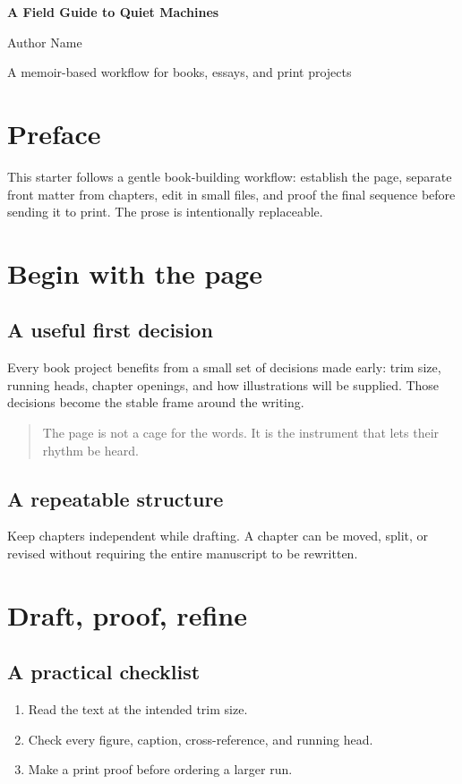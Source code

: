 \documentclass[11pt,twoside,openright]{memoir}
\begin{document}
\frontmatter
\begin{titlingpage}
\centering
\vspace*{1.1in}
{\Huge\bfseries A Field Guide to Quiet Machines\par}
\vspace{14pt}{\Large A multi-file book starter\par}
\vfill
{\Large Author Name\par}\vspace{8pt}
{\small A memoir-based workflow for books, essays, and print projects\par}
\end{titlingpage}
\cleartorecto
\chapter*{Preface}
This starter follows a gentle book-building workflow: establish the page,
separate front matter from chapters, edit in small files, and proof the final
sequence before sending it to print. The prose is intentionally replaceable.
\tableofcontents
\mainmatter
\chapter{Begin with the page}
\section{A useful first decision}
Every book project benefits from a small set of decisions made early: trim
size, running heads, chapter openings, and how illustrations will be supplied.
Those decisions become the stable frame around the writing.
\begin{quote}
The page is not a cage for the words. It is the instrument that lets their
rhythm be heard.
\end{quote}
\section{A repeatable structure}
Keep chapters independent while drafting. A chapter can be moved, split, or
revised without requiring the entire manuscript to be rewritten.
\chapter{Draft, proof, refine}
\section{A practical checklist}
\begin{enumerate}
  \item Read the text at the intended trim size.
  \item Check every figure, caption, cross-reference, and running head.
  \item Make a print proof before ordering a larger run.
\end{enumerate}
\end{document}
